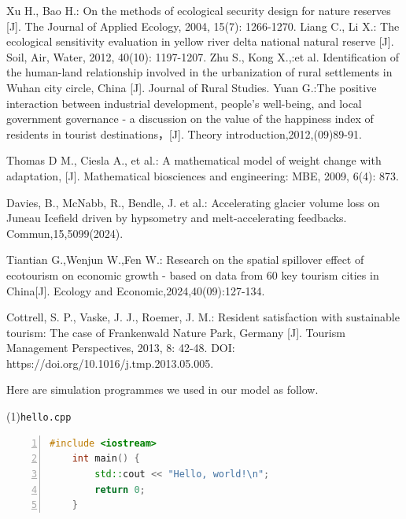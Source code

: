 \documentclass[UTF8]{mcmthesis}
\begin{document}
    \begin{thebibliography}{99}

        Xu H., Bao H.: On the methods of ecological security design for nature reserves [J]. The Journal of Applied Ecology, 2004, 15(7): 1266-1270.
         Liang C., Li X.: The ecological sensitivity evaluation in yellow river delta national natural reserve [J]. Soil, Air, Water, 2012, 40(10): 1197-1207.
        Zhu S., Kong X.,:et al. Identification of the human-land relationship involved in the urbanization of rural settlements in Wuhan city circle, China [J]. Journal of Rural Studies.
        Yuan G.:The positive interaction between industrial development, people's well-being, and local government governance - a discussion on the value of the happiness index of residents in tourist destinations，[J]. Theory introduction,2012,(09)89-91.
        
        Thomas D M., Ciesla A., et al.: A mathematical model of weight change with adaptation, [J]. Mathematical biosciences and engineering: MBE, 2009, 6(4): 873.
        
        Davies, B., McNabb, R., Bendle, J. et al.: Accelerating glacier volume loss on Juneau Icefield driven by hypsometry and melt-accelerating feedbacks. Commun,15,5099(2024). 
        
        Tiantian G.,Wenjun W.,Fen W.:
        Research on the spatial spillover effect of ecotourism on economic growth - based on data from 60 key tourism cities in China[J]. Ecology and Economic,2024,40(09):127-134.
        
        Cottrell, S. P., Vaske, J. J., Roemer, J. M.:
        Resident satisfaction with sustainable tourism: The case of Frankenwald Nature Park, Germany [J].
        Tourism Management Perspectives, 2013, 8: 42-48. 
        DOI: https://doi.org/10.1016/j.tmp.2013.05.005.
        
    
    \end{thebibliography}


    \begin{appendices}
        Here are simulation programmes we used in our model as follow.
        
        \vspace{.5em}
        \noindent(1)\quad \verb|hello.cpp|
        \vspace{.5em}
        \begin{lstlisting}[language = c++, numbers = left]
    #include <iostream>
    int main() {
        std::cout << "Hello, world!\n";
        return 0;
    }
        \end{lstlisting}

    \end{appendices}
    
\end{document}
